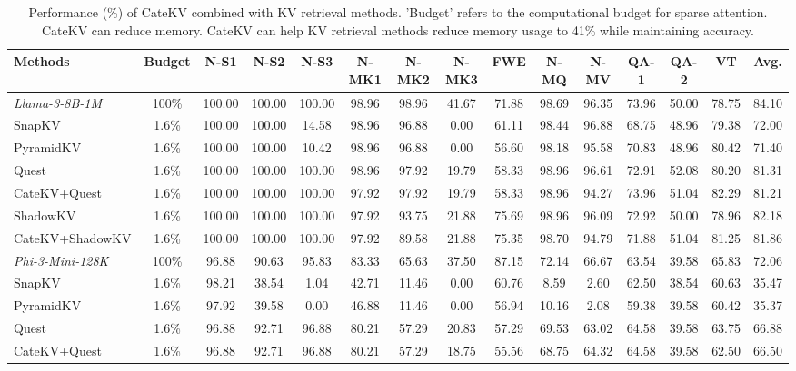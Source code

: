 \begin{table}[t]
\centering
\caption{Performance (\%) of CateKV combined with KV retrieval methods. 'Budget' refers to the computational budget for sparse attention. CateKV can reduce memory. CateKV can help KV retrieval methods reduce memory usage to 41\% while maintaining accuracy. }

\setlength{\tabcolsep}{2pt} %
\small

\begin{tabular}{l|c|cccccccccccc|c}
\toprule
Methods & Budget & N-S1 & N-S2 & N-S3 & N-MK1 & N-MK2 & N-MK3 & FWE & N-MQ & N-MV & QA-1 & QA-2 & VT & Avg. \\ 
\midrule
\textit{Llama-3-8B-1M} & 100\% & 100.00 & 100.00 & 100.00 & 98.96 & 98.96 & 41.67 & 71.88 & 98.69 & 96.35 & 73.96 & 50.00 & 78.75 & 84.10 \\
SnapKV & 1.6\% & 100.00 & 100.00 & 14.58 & 98.96 & 96.88 & 0.00 & 61.11 & 98.44 & 96.88 & 68.75 & 48.96 & 79.38 & 72.00 \\
PyramidKV & 1.6\% & 100.00 & 100.00 & 10.42 & 98.96 & 96.88 & 0.00 & 56.60 & 98.18 & 95.58 & 70.83 & 48.96 & 80.42 & 71.40 \\
Quest & 1.6\% & 100.00 & 100.00 & 100.00 & 98.96 & 97.92 & 19.79 & 58.33 & 98.96 & 96.61 & 72.91 & 52.08 & 80.20 & 81.31 \\
CateKV+Quest & 1.6\% & 100.00 & 100.00 & 100.00 & 97.92 & 97.92 & 19.79 & 58.33 & 98.96 & 94.27 & 73.96 & 51.04 & 82.29 & 81.21 \\
ShadowKV & 1.6\% & 100.00 & 100.00 & 100.00 & 97.92 & 93.75 & 21.88 & 75.69 & 98.96 & 96.09 & 72.92 & 50.00 & 78.96 & 82.18 \\
CateKV+ShadowKV & 1.6\% & 100.00 & 100.00 & 100.00 & 97.92 & 89.58 & 21.88 & 75.35 & 98.70 & 94.79 & 71.88 & 51.04 & 81.25 & 81.86 \\
\midrule
\textit{Phi-3-Mini-128K} & 100\% & 96.88 & 90.63 & 95.83 & 83.33 & 65.63 & 37.50 & 87.15 & 72.14 & 66.67 & 63.54 & 39.58 & 65.83 & 72.06 \\
SnapKV & 1.6\% & 98.21 & 38.54 & 1.04 & 42.71 & 11.46 & 0.00 & 60.76 & 8.59 & 2.60 & 62.50 & 38.54 & 60.63 & 35.47 \\
PyramidKV & 1.6\% & 97.92 & 39.58 & 0.00 & 46.88 & 11.46 & 0.00 & 56.94 & 10.16 & 2.08 & 59.38 & 39.58 & 60.42 & 35.37 \\
Quest & 1.6\% & 96.88 & 92.71 & 96.88 & 80.21 & 57.29 & 20.83 & 57.29 & 69.53 & 63.02 & 64.58 & 39.58 & 63.75 & 66.88 \\
CateKV+Quest & 1.6\% & 96.88 & 92.71 & 96.88 & 80.21 & 57.29 & 18.75 & 55.56 & 68.75 & 64.32 & 64.58 & 39.58 & 62.50 & 66.50 \\

\end{tabular}
\end{table}
